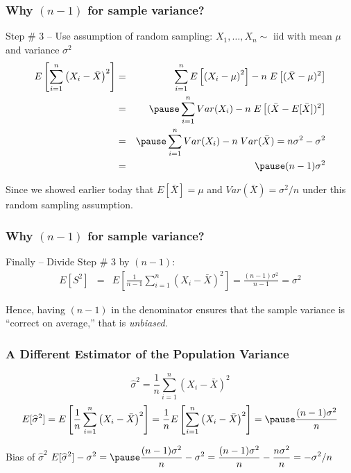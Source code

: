 \begin{frame}
\frametitle{Why $(n-1)$ for sample variance?}
\begin{block}{Step \# 3 -- Use assumption of random sampling:}
\alert{$X_1, \hdots, X_n \sim \mbox{ iid}$ with mean $\mu$ and variance $\sigma^2$}
	\begin{eqnarray*}
		E\left[\sum_{i=1}^n \left(X_i - \bar{X}\right)^2\right] &=&  \sum_{i=1}^n E\left[\left(X_i - \mu\right)^2\right] -n\;E\left[ (\bar{X}-\mu)^2\right]\\
		&=&  \pause \sum_{i=1}^n Var(X_i) -n\;E\left[ (\bar{X}-E[\bar{X}])^2\right]\\
		&=& \pause   \sum_{i=1}^n Var(X_i) -n\;Var(\bar{X})= n\sigma^2 - \sigma^2\\
		&=& \pause (n-1)\sigma^2
	\end{eqnarray*}
\end{block}
\alert{Since we showed earlier today that  $E[\bar{X}]=\mu$ and $Var(\bar{X})=\sigma^2/n$ under this random sampling assumption.}
\end{frame}

\begin{frame}
\frametitle{Why $(n-1)$ for sample variance?}
\begin{block}{Finally -- Divide Step \# 3 by $(n-1)$:}
	\begin{eqnarray*}
		E[S^2] &=& E\left[\frac{1}{n-1}\sum_{i=1}^n \left(X_i - \bar{X}\right)^2\right]= \frac{(n-1)\sigma^2}{n-1} = \sigma^2
	\end{eqnarray*}
\end{block}
\alert{Hence, having $(n-1)$ in the denominator ensures that the sample variance is ``correct on average,'' that is \emph{unbiased}.}
\end{frame}
\begin{frame}
\frametitle{A Different Estimator of the Population Variance}

$$\widehat{\sigma}^2 = \frac{1}{n}\sum_{i=1}^n \left(X_i - \bar{X}\right)^2$$
\pause
\begin{eqnarray*}
E[\widehat{\sigma}^2 ] = E\left[\frac{1}{n}\sum_{i=1}^n \left(X_i - \bar{X}\right)^2  \right]= \frac{1}{n} E\left[\sum_{i=1}^n \left(X_i - \bar{X}\right)^2\right] = \pause \frac{(n-1)\sigma^2}{n} 
\end{eqnarray*}

\begin{block}{Bias of $\widehat{\sigma}^2$}
\vspace{0.75em}
$\displaystyle E[\widehat{\sigma}^2 ] - \sigma^2 = \pause \frac{(n-1)\sigma^2}{n}  - \sigma^2 = \frac{(n-1)\sigma^2}{n}  - \frac{n\sigma^2}{n} = -\sigma^2/n$
\end{block}
\end{frame}

